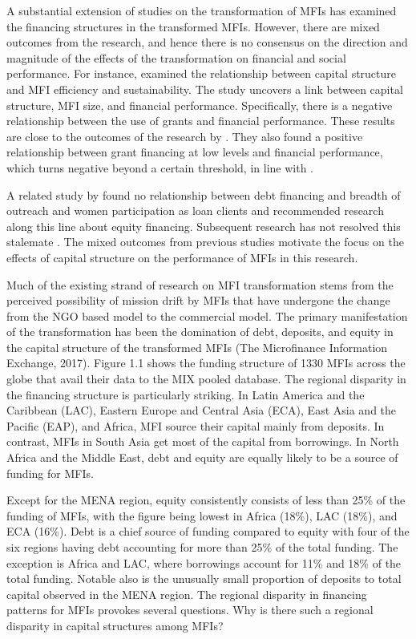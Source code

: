 \documentclass[a4paper,nobind]{templates/ociamthesis}
\begin{document}
A substantial extension of studies on the transformation of MFIs has examined the financing structures in the transformed MFIs. However, there are mixed outcomes from the research, and hence there is no consensus on the direction and magnitude of the effects of the transformation on financial and social performance. For instance, \autocite{bogan2012capital} examined the relationship between capital structure and MFI efficiency and sustainability. The study uncovers a link between capital structure, MFI size, and financial performance. Specifically, there is a negative relationship between the use of grants and financial performance. These results are close to the outcomes of the research by \autocite{hudon2011efficiency}. They also found a positive relationship between grant financing at low levels and financial performance, which turns negative beyond a certain threshold, in line with \autocite{d2017ngos}.

A related study by \textcite{kar2012does} found no relationship between debt financing and breadth of outreach and women participation as loan clients and recommended research along this line about equity financing. Subsequent research has not resolved this stalemate \autocite{hoque2011commercialization,kyereboah2007determinants,khachatryan2017performance,d2017ngos}. The mixed outcomes from previous studies motivate the focus on the effects of capital structure on the performance of MFIs in this research.

Much of the existing strand of research on MFI transformation stems from the perceived possibility of mission drift by MFIs that have undergone the change from the NGO based model to the commercial model. The primary manifestation of the transformation has been the domination of debt, deposits, and equity in the capital structure of the transformed MFIs (The Microfinance Information Exchange, 2017). Figure 1.1 shows the funding structure of 1330 MFIs across the globe that avail their data to the MIX pooled database. The regional disparity in the financing structure is particularly striking. In Latin America and the Caribbean (LAC), Eastern Europe and Central Asia (ECA), East Asia and the Pacific (EAP), and Africa, MFI source their capital mainly from deposits. In contrast, MFIs in South Asia get most of the capital from borrowings. In North Africa and the Middle East, debt and equity are equally likely to be a source of funding for MFIs.

Except for the MENA region, equity consistently consists of less than 25\% of the funding of MFIs, with the figure being lowest in Africa (18\%), LAC (18\%), and ECA (16\%). Debt is a chief source of funding compared to equity with four of the six regions having debt accounting for more than 25\% of the total funding. The exception is Africa and LAC, where borrowings account for 11\% and 18\% of the total funding. Notable also is the unusually small proportion of deposits to total capital observed in the MENA region. The regional disparity in financing patterns for MFIs provokes several questions. Why is there such a regional disparity in capital structures among MFIs?
\end{document}
